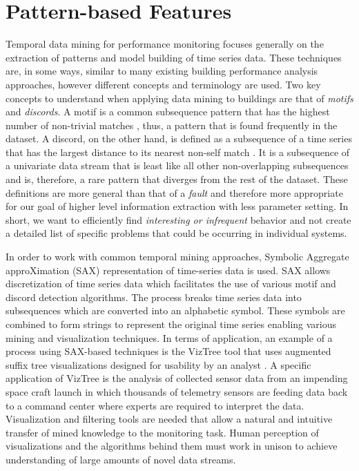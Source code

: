 \section{Pattern-based Features}
\label{sec:weatherfeatures}

Temporal data mining for performance monitoring focuses generally on the extraction of patterns and model building of time series data. These techniques are, in some ways, similar to many existing building performance analysis approaches, however different concepts and terminology are used. Two key concepts to understand when applying data mining to buildings are that of \emph{motifs} and \emph{discords}. A motif is a common subsequence pattern that has the highest number of non-trivial matches \cite{patel_mining_2002}, thus, a pattern that is found frequently in the dataset. A discord, on the other hand, is defined as a subsequence of a time series that has the largest distance to its nearest non-self match \cite{keogh_hot_2005}. It is a subsequence of a univariate data stream that is least like all other non-overlapping subsequences and is, therefore, a rare pattern that diverges from the rest of the dataset. These definitions are more general than that of a \emph{fault} and therefore more appropriate for our goal of higher level information extraction with less parameter setting. In short, we want to efficiently find \emph{interesting or infrequent} behavior and not create a detailed list of specific problems that could be occurring in individual systems.

In order to work with common temporal mining approaches, Symbolic Aggregate approXimation (SAX) representation of time-series data \cite{lin_symbolic_2003} is used. SAX allows discretization of time series data which facilitates the use of various motif and discord detection algorithms. The process breaks time series data into subsequences which are converted into an alphabetic symbol. These symbols are combined to form strings to represent the original time series enabling various mining and visualization techniques. In terms of application, an example of a process using SAX-based techniques is the VizTree tool that uses augmented suffix tree visualizations designed for usability by an analyst \cite{lin_visually_2004}. A specific application of VizTree is the analysis of collected sensor data from an impending space craft launch in which thousands of telemetry sensors are feeding data back to a command center where experts are required to interpret the data. Visualization and filtering tools are needed that allow a natural and intuitive transfer of mined knowledge to the monitoring task. Human perception of visualizations and the algorithms behind them must work in unison to achieve understanding of large amounts of novel data streams. 

